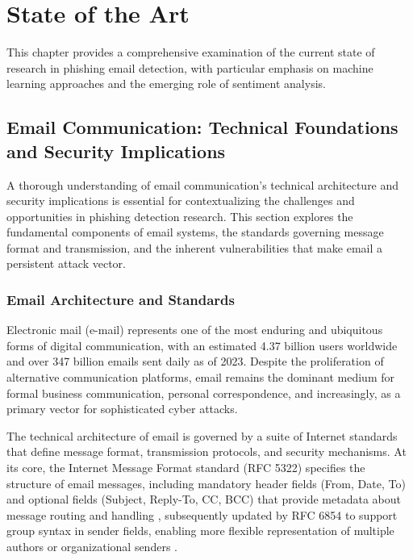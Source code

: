 \chapter{State of the Art}
\label{chapter:related_work}

This chapter provides a comprehensive examination of the current state of research in phishing email detection, with particular emphasis on machine learning approaches and the emerging role of sentiment analysis.

\section{Email Communication: Technical Foundations and Security Implications}

A thorough understanding of email communication's technical architecture and security implications is essential for contextualizing the challenges and opportunities in phishing detection research. This section explores the fundamental components of email systems, the standards governing message format and transmission, and the inherent vulnerabilities that make email a persistent attack vector.

\subsection{Email Architecture and Standards}

Electronic mail (e-mail) represents one of the most enduring and ubiquitous forms of digital communication, with an estimated 4.37 billion users worldwide and over 347 billion emails sent daily as of 2023\cite{statista_email}. Despite the proliferation of alternative communication platforms, email remains the dominant medium for formal business communication, personal correspondence, and increasingly, as a primary vector for sophisticated cyber attacks.

The technical architecture of email is governed by a suite of Internet standards that define message format, transmission protocols, and security mechanisms. At its core, the Internet Message Format standard (\ac{RFC} 5322) specifies the structure of email messages, including mandatory header fields (From, Date, To) and optional fields (Subject, Reply-To, CC, BCC) that provide metadata about message routing and handling \cite{rfc5322}, subsequently updated by \acs{RFC} 6854 to support group syntax in sender fields, enabling more flexible representation of multiple authors or organizational senders \cite{rfc6854}.

